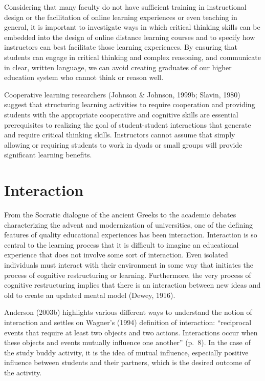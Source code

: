 \documentclass[
]{book}
\theoremstyle{definition}
\theoremstyle{definition}
\theoremstyle{definition}
\theoremstyle{definition}
\theoremstyle{remark}
\begin{document}
Considering that many faculty do not have sufficient training in instructional design or the facilitation of online learning experiences or even teaching in general, it is important to investigate ways in which critical thinking skills can be embedded into the design of online distance learning courses and to specify how instructors can best facilitate those learning experiences. By ensuring that students can engage in critical thinking and complex reasoning, and communicate in clear, written language, we can avoid creating graduates of our higher education system who cannot think or reason well.

Cooperative learning researchers (Johnson \& Johnson, 1999b; Slavin, 1980) suggest that structuring learning activities to require cooperation and providing students with the appropriate cooperative and cognitive skills are essential prerequisites to realizing the goal of student-student interactions that generate and require critical thinking skills. Instructors cannot assume that simply allowing or requiring students to work in dyads or small groups will provide significant learning benefits.

\hypertarget{interaction}{%
\section*{Interaction}\label{interaction}}

From the Socratic dialogue of the ancient Greeks to the academic debates characterizing the advent and modernization of universities, one of the defining features of quality educational experiences has been interaction. Interaction is so central to the learning process that it is difficult to imagine an educational experience that does not involve some sort of interaction. Even isolated individuals must interact with their environment in some way that initiates the process of cognitive restructuring or learning. Furthermore, the very process of cognitive restructuring implies that there is an interaction between new ideas and old to create an updated mental model (Dewey, 1916).

Anderson (2003b) highlights various different ways to understand the notion of interaction and settles on Wagner's (1994) definition of interaction: ``reciprocal events that require at least two objects and two actions. Interactions occur when these objects and events mutually influence one another'' (p.~8). In the case of the study buddy activity, it is the idea of mutual influence, especially positive influence between students and their partners, which is the desired outcome of the activity.
\end{document}
